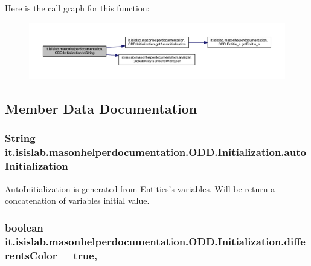 Here is the call graph for this function\-:
\nopagebreak
\begin{figure}[H]
\begin{center}
\leavevmode
\includegraphics[width=350pt]{classit_1_1isislab_1_1masonhelperdocumentation_1_1_o_d_d_1_1_initialization_a2ef8e1a36f2b1fdf31fbd256b1667001_cgraph}
\end{center}
\end{figure}




\subsection{Member Data Documentation}
\hypertarget{classit_1_1isislab_1_1masonhelperdocumentation_1_1_o_d_d_1_1_initialization_add84e104d84378945c02ac09899cb527}{
\subsubsection[{auto\-Initialization}]{\setlength{\rightskip}{0pt plus 5cm}String it.\-isislab.\-masonhelperdocumentation.\-O\-D\-D.\-Initialization.\-auto\-Initialization\hspace{0.3cm}{\ttfamily [private]}}}\label{classit_1_1isislab_1_1masonhelperdocumentation_1_1_o_d_d_1_1_initialization_add84e104d84378945c02ac09899cb527}
Auto\-Initialization is generated from Entities's variables. Will be return a concatenation of variables initial value. \hypertarget{classit_1_1isislab_1_1masonhelperdocumentation_1_1_o_d_d_1_1_initialization_aabcc05060ada9fe033fa541c5a6ac1ae}{
\subsubsection[{differents\-Color}]{\setlength{\rightskip}{0pt plus 5cm}boolean it.\-isislab.\-masonhelperdocumentation.\-O\-D\-D.\-Initialization.\-differents\-Color = true\hspace{0.3cm}{\ttfamily [static]}, {\ttfamily [private]}}}\label{classit_1_1isislab_1_1masonhelperdocumentation_1_1_o_d_d_1_1_initialization_aabcc05060ada9fe033fa541c5a6ac1ae}
